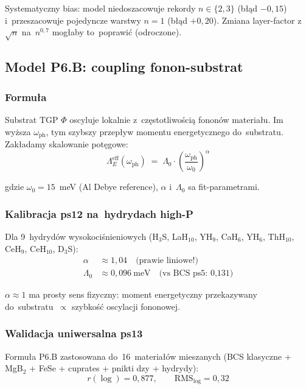 \noindent Systematyczny bias: model niedoszacowuje rekordy $n\in\{2,3\}$
(b\l{}\k{a}d $-0{,}15$) i~przeszacowuje pojedyncze warstwy $n=1$
(b\l{}\k{a}d $+0{,}20$). Zmiana layer-factor z~$\sqrt{n}$ na~$n^{0{,}7}$
mog\l{}aby to~poprawi\'c (odroczone).

\subsection{Model P6.B: coupling fonon-substrat}
\label{sec:P6B}

\subsubsection{Formu\l{}a}

Substrat TGP $\Phi$ oscyluje lokalnie z~cz\k{e}stotliwo\'sci\k{a}
fonon\'ow materia\l{}u. Im wy\.zsza $\omega_\text{ph}$, tym szybszy
przep\l{}yw momentu energetycznego do~substratu. Zak\l{}adamy skalowanie
pot\k{e}gowe:
\[
  \boxed{\quad
    \Lambda_E^{\text{eff}}(\omega_\text{ph})
    \;=\; \Lambda_0 \cdot \left(\frac{\omega_\text{ph}}{\omega_0}\right)^\alpha
  \quad}
\]

\noindent gdzie $\omega_0=15$~meV (Al Debye reference), $\alpha$ i~$\Lambda_0$
sa fit-parametrami.

\subsubsection{Kalibracja ps12 na~hydrydach high-P}

Dla 9~hydrydów wysokoci\'snieniowych (H${}_3$S, LaH${}_{10}$, YH${}_9$,
CaH${}_6$, YH${}_6$, ThH${}_{10}$, CeH${}_9$, CeH${}_{10}$, D${}_3$S):
\begin{align*}
  \alpha   &\approx 1{,}04 \quad \text{(prawie liniowe!)} \\
  \Lambda_0 &\approx 0{,}096~\text{meV} \quad \text{(vs~BCS ps5: 0{,}131)}
\end{align*}

\noindent $\alpha\approx 1$ ma prosty sens fizyczny: moment energetyczny
przekazywany do~substratu~$\propto$ szybko\'s\'c oscylacji fononowej.

\subsubsection{Walidacja uniwersalna ps13}

Formu\l{}a P6.B zastosowana do~16~materia\l{}\'ow mieszanych
(BCS klasyczne + MgB${}_2$ + FeSe + cuprates + pnikti dzy + hydrydy):
$$r(\log)=0{,}877,\qquad \mathrm{RMS}_{\log}=0{,}32$$

